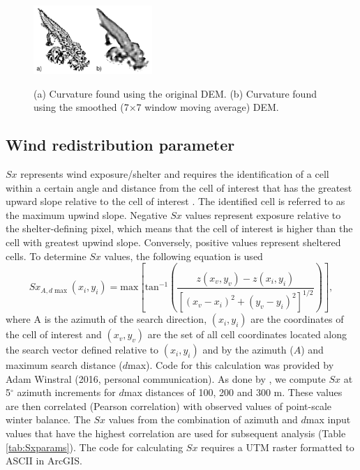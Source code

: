 \documentclass[onecolumn, letterpaper]{igs}
\begin{document}
\begin{figure}[b]
	\centering
	\includegraphics[width = 0.4\textwidth]{G13curvatureSmoothing.jpeg}\\
	\caption[Curvature found using the original and smoothed DEM]{(a) Curvature found using the original DEM. (b) Curvature found using the smoothed (7$\times$7 window moving average) DEM.}
	\label{fig:smoothingCurve}
\end{figure}

\subsection*{Wind redistribution parameter} 

$Sx$ represents wind exposure/shelter and requires the identification of a cell within a certain angle and distance from the cell of interest that has the greatest upward slope relative to the cell of interest \citep{Winstral2002}. The identified cell is referred to as the maximum upwind slope. Negative $Sx$ values represent exposure relative to the shelter-defining pixel, which means that the cell of interest is higher than the cell with greatest upwind slope. Conversely, positive values represent sheltered cells. To determine $Sx$ values, the following equation is used
\begin{equation}
Sx_{A, d\max}(x_i, y_i) = \textrm{max} \left[ \textrm{tan}^{-1} \left( \frac{z(x_v,y_v)-z(x_i,y_i)}{[(x_v-x_i)^2+(y_v-y_i)^2]^{1/2}} \right) \right] ,
\end{equation}
where A is the azimuth of the search direction, $(x_i, y_i)$ are the coordinates of the cell of interest and $(x_v, y_v)$ are the set of all cell coordinates located along the search vector defined relative to $(x_i, y_i)$ and by the azimuth ($A$) and maximum search distance ($d$max). Code for this calculation was provided by Adam Winstral (2016, personal communication). As done by \cite{McGrath2015}, we compute $Sx$ at 5$^{\circ}$ azimuth increments for $d$max distances of 100, 200 and 300 m. These values are then correlated (Pearson correlation) with observed values of point-scale winter balance. The $Sx$ values from the combination of azimuth and $d$max input values that have the highest correlation are used for subsequent analysis (Table \ref{tab:Sxparams}). The code for calculating $Sx$ requires a UTM raster formatted to ASCII in ArcGIS. 
\end{document}
